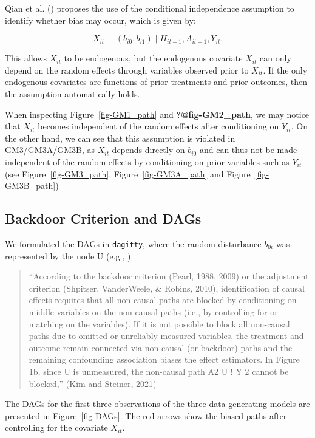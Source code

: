 \documentclass[
  12pt,
  a4paper,
]{article}
\begin{document}
Qian et al. () proposes the use of the
conditional independence assumption to identify whether bias may occur,
which is given by:

\[ X_{it} \perp (b_{i0}, b_{i1}) \mid H_{it-1}, A_{it-1}, Y_{it}. \]

This allows \(X_{it}\) to be endogenous, but the endogenous covariate
\(X_{it}\) can only depend on the random effects through variables
observed prior to \(X_{it}\). If the only endogenous covariates are
functions of prior treatments and prior outcomes, then the assumption
automatically holds.

When inspecting Figure~\ref{fig-GM1_path} and \textbf{?@fig-GM2\_path},
we may notice that \(X_{it}\) becomes independent of the random effects
after conditioning on \(Y_{it}\). On the other hand, we can see that
this assumption is violated in GM3/GM3A/GM3B, as \(X_{it}\) depends
directly on \(b_{i0}\) and can thus not be made independent of the
random effects by conditioning on prior variables such as \(Y_{it}\)
(see Figure~\ref{fig-GM3_path}, Figure~\ref{fig-GM3A_path} and
Figure~\ref{fig-GM3B_path})

\subsection{Backdoor Criterion and
DAGs}\label{backdoor-criterion-and-dags}

We formulated the DAGs in \texttt{dagitty}, where the random disturbance
\(b_{0i}\) was represented by the node U (e.g.,
).

\begin{quote}
``According to the backdoor criterion (Pearl, 1988, 2009) or the
adjustment criterion (Shpitser, VanderWeele, \& Robins, 2010),
identification of causal effects requires that all non-causal paths are
blocked by conditioning on middle variables on the non-causal paths
(i.e., by controlling for or matching on the variables). If it is not
possible to block all non-causal paths due to omitted or unreliably
measured variables, the treatment and outcome remain connected via
non-causal (or backdoor) paths and the remaining confounding association
biases the effect estimators. In Figure 1b, since U is unmeasured, the
non-causal path A2 U ! Y 2 cannot be blocked,'' (Kim and Steiner, 2021)
\end{quote}

The DAGs for the first three observations of the three data generating
models are presented in Figure~\ref{fig-DAGs}. The red arrows show the
biased paths after controlling for the covariate \(X_{it}\).
\end{document}
